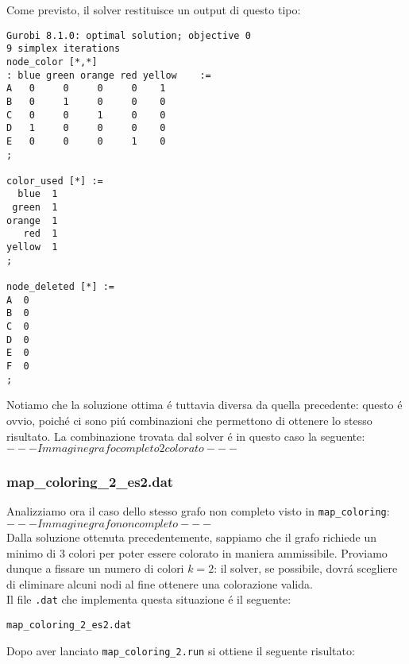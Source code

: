 \documentclass{article}
\begin{document}
Come previsto, il solver restituisce un output di questo tipo:\\

\begin{verbatim}
Gurobi 8.1.0: optimal solution; objective 0
9 simplex iterations
node_color [*,*]
: blue green orange red yellow    :=
A   0     0     0     0    1
B   0     1     0     0    0
C   0     0     1     0    0
D   1     0     0     0    0
E   0     0     0     1    0
;

color_used [*] :=
  blue  1
 green  1
orange  1
   red  1
yellow  1
;

node_deleted [*] :=
A  0
B  0
C  0
D  0
E  0
F  0
;

\end{verbatim}

Notiamo che la soluzione ottima \'e tuttavia diversa da quella precedente: questo \'e ovvio, poich\'e ci sono pi\'u combinazioni che permettono di ottenere lo stesso risultato. La combinazione trovata dal solver \'e in questo caso la seguente:\\

$ --- Immagine grafo completo 2 colorato --- $\\

\subsubsection{map\_coloring\_2\_es2.dat}
Analizziamo ora il caso dello stesso grafo non completo visto in \texttt{map\_coloring}:\\

$ --- Immagine grafo non completo --- $\\

Dalla soluzione ottenuta precedentemente, sappiamo che il grafo richiede un minimo di 3 colori per poter essere colorato in maniera ammissibile. Proviamo dunque a fissare un numero di colori $k = 2$: il solver, se possibile, dovr\'a scegliere di eliminare alcuni nodi al fine ottenere una colorazione valida.\\

Il file \texttt{.dat} che implementa questa situazione \'e il seguente:

\vspace{5mm}
\texttt{map\_coloring\_2\_es2.dat}

\vspace{5mm}

Dopo aver lanciato \texttt{map\_coloring\_2.run} si ottiene il seguente risultato:\\
\end{document}
